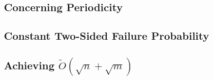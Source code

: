 \documentclass[12pt]{IEEEtran}
\begin{document}
\subsection{Concerning Periodicity}

\subsection{Constant Two-Sided Failure Probability}
\subsection{Achieving \texorpdfstring{$\tilde{O}(\sqrt{n} + \sqrt{m})$}{O(sqrt(n)+sqrt(m))}}



\end{document}
